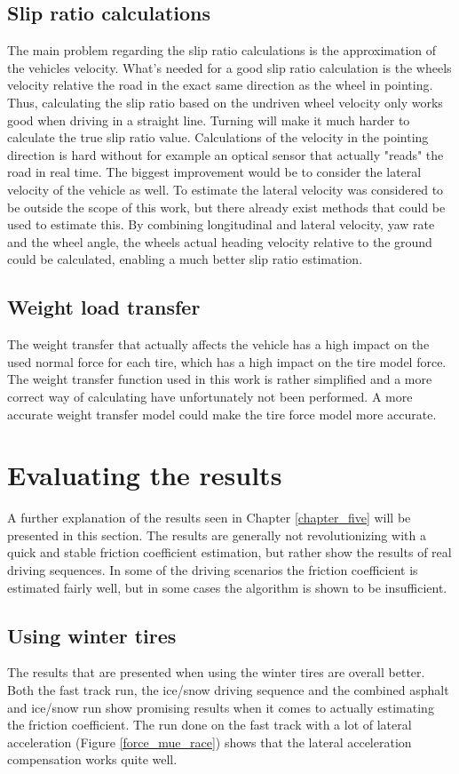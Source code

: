 \subsection{Slip ratio calculations}
The main problem regarding the slip ratio calculations is the approximation of the vehicles velocity. What's needed for a good slip ratio calculation is the wheels velocity relative the road in the exact same direction as the wheel in pointing. Thus, calculating the slip ratio based on the undriven wheel velocity only works good when driving in a straight line. Turning will make it much harder to calculate the true slip ratio value. Calculations of the velocity in the pointing direction is hard without for example an optical sensor that actually "reads" the road in real time. The biggest improvement would be to consider the lateral velocity of the vehicle as well. To estimate the lateral velocity was considered to be outside the scope of this work, but there already exist methods that could be used to estimate this. By combining longitudinal and lateral velocity, yaw rate and the wheel angle, the wheels actual heading velocity relative to the ground could be calculated, enabling a much better slip ratio estimation.

\subsection{Weight load transfer}
The weight transfer that actually affects the vehicle has a high impact on the used normal force for each tire, which has a high impact on the tire model force. The weight transfer function used in this work is rather simplified and a more correct way of calculating have unfortunately not been performed. A more accurate weight transfer model could make the tire force model more accurate.   

\section{Evaluating the results}
A further explanation of the results seen in Chapter \ref{chapter_five} will be presented in this section. The results are generally not revolutionizing with a quick and stable friction coefficient estimation, but rather show the results of real driving sequences. In some of the driving scenarios the friction coefficient is estimated fairly well, but in some cases the algorithm is shown to be insufficient. 

\subsection{Using winter tires}
The results that are presented when using the winter tires are overall better. Both the fast track run, the ice/snow driving sequence and the combined asphalt and ice/snow run show promising results when it comes to actually estimating the friction coefficient. The run done on the fast track with a lot of lateral acceleration (Figure \ref{force_mue_race}) shows that the lateral acceleration compensation works quite well.

